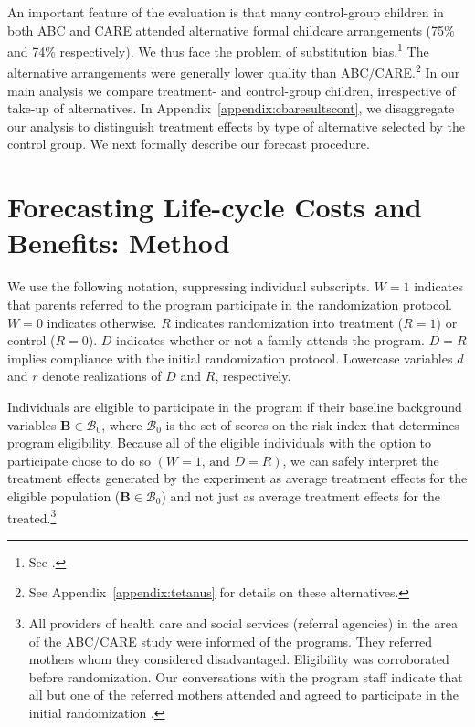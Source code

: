 An important feature of the evaluation is that many control-group children in both ABC and CARE attended alternative formal childcare arrangements (75\% and 74\% respectively). We thus face the problem of substitution bias.\footnote{See \citet{Heckman_1992_randomization,Heckman_Hohmann_etal_2000_QJE,Kline_Walters_2016_QJE}.} The alternative arrangements were generally lower quality than ABC/CARE.\footnote{See Appendix~\ref{appendix:tetanus} for details on these alternatives.} In our main analysis we compare treatment- and control-group children, irrespective of take-up of alternatives. In Appendix~\ref{appendix:cbaresultscont}, we disaggregate our analysis to distinguish treatment effects by type of alternative selected by the control group. We next formally describe our forecast procedure.

\section{Forecasting Life-cycle Costs and Benefits: Method} \label{section:cbamethodology}

We use the following notation, suppressing individual subscripts. $W=1$ indicates that parents referred to the program participate in the randomization protocol. $W=0$ indicates otherwise. $R$ indicates randomization into treatment ($R = 1$) or control ($R = 0$). $D$ indicates whether or not a family attends the program. $D = R$ implies compliance with the initial randomization protocol. Lowercase variables $d$ and $r$ denote realizations of $D$ and $R$, respectively.

Individuals are eligible to participate in the program if their baseline background variables $\bm{B}\in\mathcal{B}_0$, where $\mathcal{B}_0$ is the set of scores on the risk index that determines program eligibility. Because all of the eligible individuals with the option to participate chose to do so $(W=1\text{, and } D=R)$, we can safely interpret the treatment effects generated by the experiment as average treatment effects for the eligible population ($\bm{B}\in\mathcal{B}_0$) and not just as average treatment effects for the treated.\footnote{All providers of health care and social services (referral agencies) in the area of the ABC/CARE study were informed of the programs. They referred mothers whom they considered disadvantaged. Eligibility was corroborated before randomization. Our conversations with the program staff indicate that all but one of the referred mothers attended and agreed to participate in the initial randomization \citep{Ramey-etal_2012-ABC}.}

